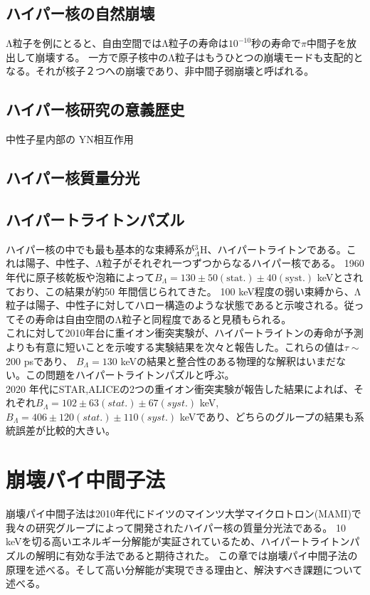 \documentclass[a4paper,11pt,uplatex]{jsbook}
\begin{document}
\subsection{ハイパー核の自然崩壊}
Λ粒子を例にとると、自由空間ではΛ粒子の寿命は$10^{-10}$秒の寿命で$\pi$中間子を放出して崩壊する。
一方で原子核中のΛ粒子はもうひとつの崩壊モードも支配的となる。それが核子２つへの崩壊であり、非中間子弱崩壊と呼ばれる。
\subsection{ハイパー核研究の意義歴史}
中性子星内部の YN相互作用
\subsection{ハイパー核質量分光}
\subsection{ハイパートライトンパズル}
ハイパー核の中でも最も基本的な束縛系が$^3_{\Lambda}\text{H}$、ハイパートライトンである。これは陽子、中性子、Λ粒子がそれぞれ一つずつからなるハイパー核である。
1960年代に原子核乾板や泡箱によって$B_{\Lambda} = 130 \pm 50(\text{stat.}) \pm 40(\text{syst.})$ keVとされており、この結果が約50 年間信じられてきた。
100 keV程度の弱い束縛から、Λ粒子は陽子、中性子に対してハロー構造のような状態であると示唆される。従ってその寿命は自由空間のΛ粒子と同程度であると見積もられる。\\
これに対して2010年台に重イオン衝突実験が、ハイパートライトンの寿命が予測よりも有意に短いことを示唆する実験結果を次々と報告した。これらの値は$\tau \sim$200 psであり、
$B_{\Lambda} = 130$ keVの結果と整合性のある物理的な解釈はいまだない。この問題をハイパートライトンパズルと呼ぶ。\\
2020 年代にSTAR,ALICEの2つの重イオン衝突実験が報告した結果によれば、それぞれ$B_{\Lambda}= 102 \pm 63(stat.) \pm 67(syst.)$ keV, 
$B_{\Lambda} = 406 \pm 120(stat.) \pm 110 (syst.)$ keVであり、どちらのグループの結果も系統誤差が比較的大きい。

\section{崩壊パイ中間子法}
崩壊パイ中間子法は2010年代にドイツのマインツ大学マイクロトロン(MAMI)で我々の研究グループによって開発されたハイパー核の質量分光法である。
10 keVを切る高いエネルギー分解能が実証されているため、ハイパートライトンパズルの解明に有効な手法であると期待された。
この章では崩壊パイ中間子法の原理を述べる。そして高い分解能が実現できる理由と、解決すべき課題について述べる。
\end{document}
